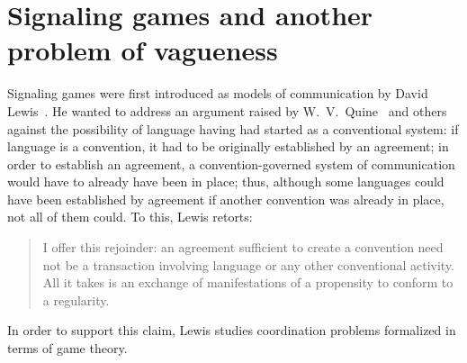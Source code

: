 \documentclass[a4paper]{article}
\begin{document}

\section{Signaling games and another problem of vagueness}
\label{sec:signaling-and-Lipman}

Signaling games were first introduced as models of communication by David Lewis~\parencite*{lewis_convention_1969}.
He wanted to address an argument raised by W.~V.~Quine~\parencite*{quine_truth_1936} and others against the possibility of language having had started as a conventional system: if language is a convention, it had to be originally established by an agreement; in order to establish an agreement, a convention-governed system of communication would have to already have been in place; thus, although some languages could have been established by agreement if another convention was already in place, not all of them could.
To this, Lewis retorts:
\begin{quote}
I offer this rejoinder: an agreement sufficient to create a convention need not be a transaction involving language or any other conventional activity.
All it takes is an exchange of manifestations of a propensity to conform to a regularity.%
~\parencite*[87--88]{lewis_convention_1969}
\end{quote}
In order to support this claim, Lewis studies coordination problems formalized in terms of game theory.
\end{document}
